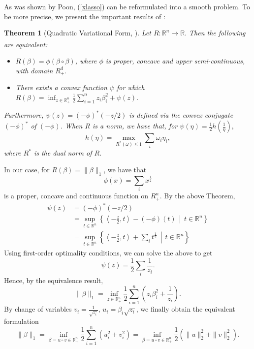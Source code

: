 \documentclass[11pt, twoside]{report}
\newtheorem{theorem}{Theorem}[section]
\begin{document}
As was shown by Poon\cite{poon}, (\ref{xlasso}) can be reformulated into a smooth problem. To be more precise, we present the important results of \cite{poon}:
\begin{theorem}[Quadratic Variational Form, \cite{poon}] \label{qvf_thm}
Let $R:\mathbb{R}^n \xrightarrow[]{} \mathbb{R}.$ Then the following are equivalent:
\begin{itemize}
    \item $R(\beta) = \phi(\beta \circ \beta)$, where $\phi$ is proper, concave and upper semi-continuous, with domain $R^d_+.$
    \item There exists a convex function $\psi$ for which $R(\beta) = \inf_{z \in \mathbb{R}^n_+} \frac{1}{2} \sum_{i=1}^n z_i \beta_i^2 + \psi(z).$
\end{itemize}
Furthermore, $\psi(z) = (-\phi)^* (-z/2)$ is defined via the convex conjugate $(-\phi)^*$ of $(-\phi)$. When $R$ is a norm, we have that, for $\psi(\eta) = \frac{1}{2} h(\frac{1}{\eta}),$
\[h(\eta) = \max_{R^*(\omega) \leq 1} \sum_i \omega_i \eta_i,\]
where $R^*$ is the dual norm of $R$.
\end{theorem}
In our case, for $R(\beta) = \|\beta\|_1$, we have that 
\[\phi(x) = \sum_i x^{\frac{1}{2}}\]
is a proper, concave and continuous function on $R^n_+$. By the above Theorem,
\begin{align*}
    \psi(z) &= (-\phi)^*(-z/2) \\
            &= \sup_{t \in \mathbb{R}^n} \left\{ \left\langle -\frac{z}{2},t \right\rangle - (-\phi)(t) \, \middle| \, t\in\mathbb{R}^n\right\} \\
            &= \sup_{t \in \mathbb{R}^n} \left\{ \left\langle -\frac{z}{2},t \right\rangle + \sum_i t^{\frac{1}{2}} \, \middle| \, t\in\mathbb{R}^n\right\}
\end{align*}
Using first-order optimality conditions, we can solve the above to get
\[\psi(z) = \frac{1}{2} \sum_i \frac{1}{z_i}.\]
Hence, by the equivalence result,
\begin{equation} \label{quad_form_l1}
    \|\beta\|_1 = \inf_{z \in \mathbb{R}^n_+} \frac{1}{2} \sum_{i=1}^n  \left( z_i \beta_i^2 + \frac{1}{z_i} \right).
\end{equation}
By change of variables $v_i = \frac{1}{\sqrt{z_i}}$, $u_i = \beta_i\sqrt{z_i}$, we finally obtain the equivalent formulation
\begin{equation} \label{uv_form_l1}
    \|\beta\|_1 = \inf_{\beta = u \circ v \in \mathbb{R}^n_+} \frac{1}{2} \sum_{i=1}^n  \left( u_i^2 + v_i^2 \right) = \inf_{\beta = u \circ v \in \mathbb{R}^n_+} \frac{1}{2} \left( \|u\|_2^2 + \|v\|_2^2 \right).
\end{equation}
\end{document}
